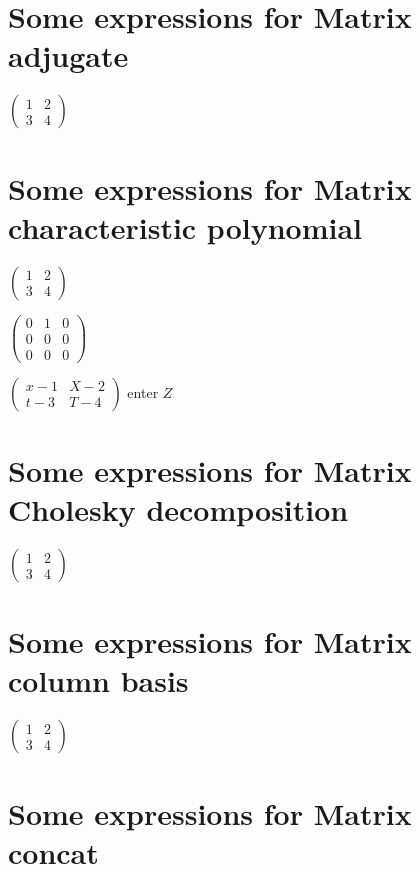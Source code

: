 \documentclass{article}
\begin{document}
\section{Some expressions for Matrix adjugate}

$\left( 
\begin{array}{cc}
1 & 2 \\ 
3 & 4%
\end{array}%
\right) $

\section{Some expressions for Matrix characteristic polynomial}

$\left( 
\begin{array}{cc}
1 & 2 \\ 
3 & 4%
\end{array}%
\right) $

$\left( 
\begin{array}{ccc}
0 & 1 & 0 \\ 
0 & 0 & 0 \\ 
0 & 0 & 0%
\end{array}%
\right) $

$\left( 
\begin{array}{cc}
x-1 & X-2 \\ 
t-3 & T-4%
\end{array}%
\right) $ enter $Z$

\section{Some expressions for Matrix Cholesky decomposition}

$\left( 
\begin{array}{cc}
1 & 2 \\ 
3 & 4%
\end{array}%
\right) $

\section{Some expressions for Matrix column basis}

$\left( 
\begin{array}{cc}
1 & 2 \\ 
3 & 4%
\end{array}%
\right) $

\section{Some expressions for Matrix concat}
\end{document}
